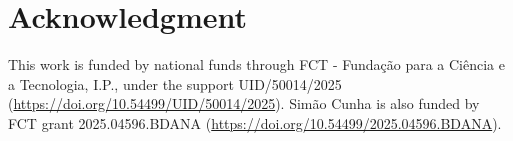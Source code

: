 \section*{Acknowledgment}

This work is funded by national funds 
through FCT - Fundação para a Ciência e a Tecnologia, I.P., under the support 
UID/50014/2025 (\url{https://doi.org/10.54499/UID/50014/2025}).
Simão Cunha is also funded by FCT grant 2025.04596.BDANA (\url{https://doi.org/10.54499/2025.04596.BDANA}).
